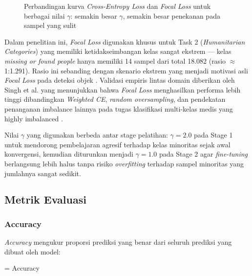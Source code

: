 \begin{figure}[h]
    \centering
    \fbox{\rule{0pt}{4cm}\rule{0.65\textwidth}{0pt}}
    \caption{Perbandingan kurva \textit{Cross-Entropy Loss} dan
    \textit{Focal Loss} untuk berbagai nilai $\gamma$: semakin besar
    $\gamma$, semakin besar penekanan pada sampel yang sulit
    \cite{lin2017focal}}
    \label{fig:focal_loss_curve}
\end{figure}

Dalam penelitian ini, \textit{Focal Loss} digunakan khusus untuk Task 2
(\textit{Humanitarian Categories}) yang memiliki ketidakseimbangan
kelas sangat ekstrem — kelas \textit{missing or found people} hanya
memiliki 14 sampel dari total 18.082 (rasio $\approx$1:1.291). Rasio
ini sebanding dengan skenario ekstrem yang menjadi motivasi asli
\textit{Focal Loss} pada deteksi objek \cite{lin2017focal}. Validasi
empiris lintas domain diberikan oleh Singh et al. yang menunjukkan
bahwa \textit{Focal Loss} menghasilkan performa lebih tinggi
dibandingkan \textit{Weighted CE}, \textit{random oversampling}, dan
pendekatan penanganan imbalance lainnya pada tugas klasifikasi
multi-kelas medis yang highly imbalanced \cite{singh2023bbfl}. \par

Nilai $\gamma$ yang digunakan berbeda antar stage pelatihan: $\gamma
= 2.0$ pada Stage 1 untuk mendorong pembelajaran agresif terhadap
kelas minoritas sejak awal konvergensi, kemudian diturunkan menjadi
$\gamma = 1.0$ pada Stage 2 agar \textit{fine-tuning} berlangsung lebih
halus tanpa risiko \textit{overfitting} terhadap sampel minoritas yang
jumlahnya sangat sedikit. \par


\subsection{Metrik Evaluasi} \label{II.Teori.Metrik}

\subsubsection{Accuracy}
\textit{Accuracy} mengukur proporsi prediksi yang benar dari seluruh
prediksi yang dibuat oleh model:

\begin{equationcaptioned}[eq:accuracy]{
     = 
}{
    Accuracy
}
\end{equationcaptioned}

